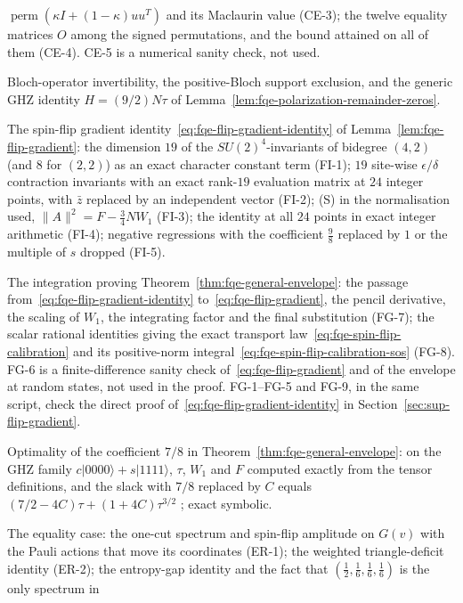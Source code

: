\begin{description}
$\operatorname{perm}(\kappa I+(1-\kappa)uu^T)$ and its Maclaurin value (CE-3); the twelve equality matrices $O$ among the
signed permutations, and the bound attained on all of them (CE-4). CE-5 is a numerical sanity check, not used.
\item[PZ-1--PZ-2] Bloch-operator invertibility, the positive-Bloch support exclusion, and the generic GHZ identity
$H=(9/2)N\tau$ of Lemma~\ref{lem:fqe-polarization-remainder-zeros}.
\item[FI-1--FI-5] The spin-flip gradient identity~\eqref{eq:fqe-flip-gradient-identity} of Lemma~\ref{lem:fqe-flip-gradient}:
the dimension $19$ of the $SU(2)^4$-invariants of bidegree $(4,2)$ (and $8$ for $(2,2)$) as an exact character constant term
(FI-1); $19$ site-wise $\epsilon/\delta$ contraction invariants with an exact rank-$19$ evaluation matrix at $24$ integer points,
with $\bar z$ replaced by an independent vector (FI-2); (S) in the normalisation used, $\|A\|^2=F-\frac34NW_1$ (FI-3); the identity
at all $24$ points in exact integer arithmetic (FI-4); negative regressions with the coefficient $\frac98$ replaced by $1$ or the
multiple of $s$ dropped (FI-5).
\item[FG-6--FG-8] The integration proving Theorem~\ref{thm:fqe-general-envelope}: the passage
from~\eqref{eq:fqe-flip-gradient-identity} to~\eqref{eq:fqe-flip-gradient}, the pencil derivative, the scaling of $W_1$, the
integrating factor and the final substitution (FG-7); the scalar rational identities giving the exact transport
law~\eqref{eq:fqe-spin-flip-calibration} and its positive-norm integral~\eqref{eq:fqe-spin-flip-calibration-sos} (FG-8). FG-6 is a
finite-difference sanity check of~\eqref{eq:fqe-flip-gradient} and of the envelope at random states, not used in the proof. FG-1--FG-5
and FG-9, in the same script, check the direct proof of~\eqref{eq:fqe-flip-gradient-identity} in Section~\ref{sec:sup-flip-gradient}.
\item[ESH-1--ESH-3] Optimality of the coefficient $7/8$ in Theorem~\ref{thm:fqe-general-envelope}: on the GHZ family
$c|0000\rangle+s|1111\rangle$, $\tau$, $W_1$ and $F$ computed exactly from the tensor definitions, and the slack with $7/8$
replaced by $C$ equals $(7/2-4C)\tau+(1+4C)\tau^{3/2}$ ; exact symbolic.
\item[ER-1--ER-5] The equality case: the one-cut spectrum and spin-flip amplitude on $G(v)$ with the
Pauli actions that move its coordinates (ER-1); the weighted triangle-deficit identity (ER-2); the
entropy-gap identity and the fact that $(\tfrac12,\tfrac16,\tfrac16,\tfrac16)$ is the only spectrum in

\end{description}
